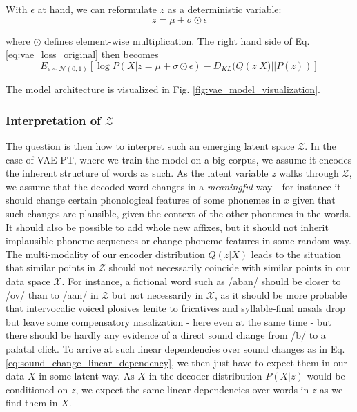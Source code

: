\documentclass[6pt]{article}
\begin{document}
With $\epsilon$ at hand, we can reformulate $z$ as a deterministic variable:
\begin{equation}
z = \mu + \sigma \odot \epsilon
\end{equation}

where $\odot$ defines element-wise multiplication.
The right hand side of Eq. \ref{eq:vae_loss_original} then becomes
\begin{equation}
\label{eq:vae_loss_reparameterized}
E_{\epsilon \sim \mathcal{N}(0,1)}[\log P(X|z= \mu + \sigma \odot \epsilon) - D_{KL}(Q(z|X)||P(z))] 
\end{equation}

The model architecture is visualized in Fig. \ref{fig:vae_model_visualization}. 




\subsubsection{Interpretation of $\mathcal{Z}$}
\label{interpretation_of_z}
The question is then how to interpret such an emerging latent space $\mathcal{Z}$. In the case of VAE-PT, where we train the model on a big corpus, we assume it encodes the inherent structure of words as such. As the latent variable $z$ walks through $\mathcal{Z}$, we assume that the decoded word changes in a \textit{meaningful} way - for instance it should change certain phonological features of some phonemes in $x$ given that such changes are plausible, given the context of the other phonemes in the words. It should also be possible to add whole new affixes, but it should not inherit implausible phoneme sequences or change phoneme features in some random way. The multi-modality of our encoder distribution $Q(z|X)$ leads to the situation that similar points in $\mathcal{Z}$ should not necessarily coincide with similar points in our data space $\mathcal{X}$. For instance, a fictional word such as /aban/ should be closer to /ov/ than to /a\textipa{\textdoublebarpipe}an/ in $\mathcal{Z}$ but not necessarily in $\mathcal{X}$, as it should be more probable that intervocalic voiced plosives lenite to fricatives and syllable-final nasals drop but leave some compensatory nasalization - here even at the same time - but there should be hardly any evidence of a direct sound change from /b/ to a palatal click. To arrive at such linear dependencies over sound changes as in Eq. \ref{eq:sound_change_linear_dependency}, we then just have to expect them in our data $X$ in some latent way. As $X$ in the decoder distribution $P(X|z)$ would be conditioned on $z$, we expect the same linear dependencies over words in $z$ as we find them in $X$.
\end{document}
